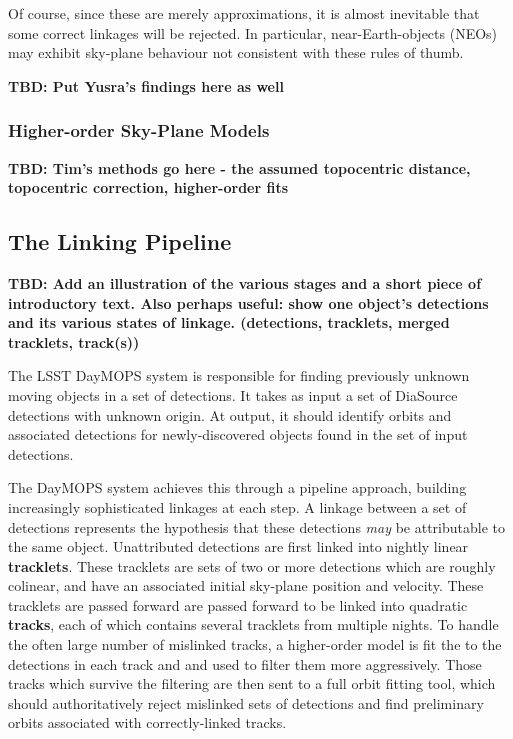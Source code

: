 Of course, since these are merely approximations, it is almost
inevitable that some correct linkages will be rejected.  In
particular, near-Earth-objects (NEOs) may exhibit sky-plane behaviour
not consistent with these rules of thumb.

\textbf{TBD: Put Yusra's findings here as well}

\subsubsection{Higher-order Sky-Plane Models}
\textbf{TBD: Tim's methods go here - the assumed topocentric distance, topocentric correction, higher-order fits}

\subsection{The Linking Pipeline}
\textbf{TBD: Add an illustration of the various stages and a short piece of
introductory text.  Also perhaps useful: show one object's detections and its various states of linkage. (detections, tracklets, merged tracklets, track(s))}

The LSST DayMOPS system is responsible for finding previously unknown
moving objects in a set of detections.  It takes as input a set of
DiaSource detections with unknown origin.  At output, it should
identify orbits and associated detections for newly-discovered objects
found in the set of input detections.  

The DayMOPS system achieves this through a pipeline approach, building
increasingly sophisticated linkages at each step.  A linkage between a
set of detections represents the hypothesis that these detections
\textit{may} be attributable to the same object.  Unattributed
detections are first linked into nightly linear \textbf{tracklets}.
These tracklets are sets of two or more detections which are roughly
colinear, and have an associated initial sky-plane position and
velocity.  These tracklets are passed forward are passed forward to be
linked into quadratic \textbf{tracks}, each of which contains several
tracklets from multiple nights.  To handle the often large number of
mislinked tracks, a higher-order model is fit the to the detections in
each track and and used to filter them more aggressively.  Those
tracks which survive the filtering are then sent to a full orbit
fitting tool, which should authoritatively reject mislinked sets of
detections and find preliminary orbits associated with
correctly-linked tracks.

